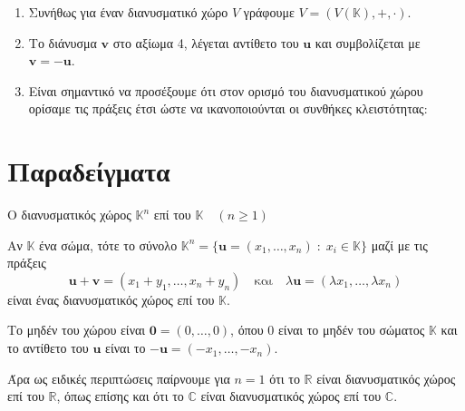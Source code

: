 \begin{rem}
\item {}
    \begin{enumerate}
        \item Συνήθως για έναν διανυσματικό χώρο $V$ γράφουμε 
            $V = (V(\mathbb{K}), +, \cdot) $.
        \item Το διάνυσμα $ \mathbf{v} $ στο αξίωμα 4, λέγεται 
            \textcolor{Col2}{αντίθετο} του $ \mathbf{u} $ και συμβολίζεται με 
            $ \mathbf{v} = - \mathbf{u} $.
        \item Είναι σημαντικό να προσέξουμε ότι στον ορισμό του διανυσματικού χώρου 
            ορίσαμε τις πράξεις έτσι ώστε να ικανοποιούνται οι συνθήκες κλειστότητας:
    \end{enumerate}
\end{rem}


\section{Παραδείγματα}


\begin{example}\label{ex:Rn}
    \textcolor{Col2}{Ο διανυσματικός χώρος $ \mathbb{K}^{n} $ 
    επί του $ \mathbb{K} \quad (n \geq 1) $}

    Αν $ \mathbb{K} $ ένα σώμα, τότε το σύνολο $ \mathbb{K}^{n} = 
    \{ \mathbf{u} = (x_{1},\ldots,x_{n}) \; : \; x_{i} \in \mathbb{K}\} $ 
    μαζί με τις πράξεις 
    \[
        \mathbf{u}+ \mathbf{v} = (x_{1}+ y_{1}, \ldots , x_{n}+y_{n}) 
        \quad \text{και} \quad \lambda \mathbf{u} = 
        ( \lambda x_{1}, \ldots, \lambda x_{n})
    \]
    είναι ένας διανυσματικός χώρος επί του $ \mathbb{K} $. 

    Το μηδέν του χώρου 
    είναι $ \mathbf{0} = (0,\ldots,0) $, όπου $0$ είναι το μηδέν του σώματος 
    $ \mathbb{K} $ και το αντίθετο του $ \mathbf{u} $ είναι το $ - \mathbf{u} =
    (- x_{1}, \ldots, - x_{n}) $.

    Άρα ως ειδικές περιπτώσεις παίρνουμε για $ n=1 $ ότι το $ \mathbb{R} $ 
    είναι διανυσματικός χώρος επί του $ \mathbb{R} $, όπως επίσης και ότι το 
    $ \mathbb{C} $ είναι διανυσματικός χώρος επί του $ \mathbb{C} $.
\end{example} 

